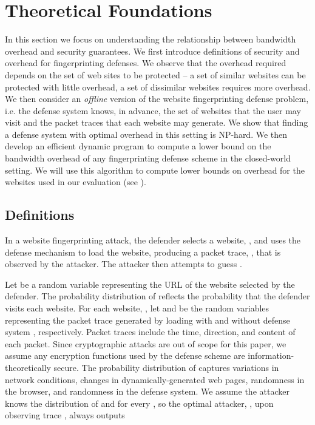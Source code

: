\documentclass[10pt,journal]{IEEEtran}
\begin{document}
\section{Theoretical Foundations}
\label{sec:theory}

In this section we focus on understanding the relationship between
bandwidth overhead and security guarantees. We first introduce
definitions of security and overhead for fingerprinting defenses.  We
observe that the overhead required depends on the set of web sites to
be protected -- a set of similar websites can be protected with little
overhead, a set of dissimilar websites requires more overhead.  We
then consider an \emph{offline} version of the website fingerprinting
defense problem, i.e. the defense system knows, in advance, the set of
websites that the user may visit and the packet traces that each
website may generate.  We show that finding a defense system with
optimal overhead in this setting is NP-hard.  We then develop an
efficient dynamic program to compute a lower bound on the bandwidth
overhead of any fingerprinting defense scheme in the closed-world
setting. We will use this algorithm to compute lower bounds on
overhead for the websites used in our evaluation (see
).


\subsection{Definitions}
\label{subsec:security_def}

In a website fingerprinting attack, the defender selects a website,
, and uses the defense mechanism to load the website, producing a
packet trace, , that is observed by the attacker.  The attacker
then attempts to guess .

Let  be a random variable representing the URL of the website
selected by the defender.  The probability distribution of 
reflects the probability that the defender visits each website.  For
each website, , let  and  be the random variables representing the
packet trace generated by loading  with and without defense system , respectively.
Packet traces include the time, direction, and content of each packet.
Since cryptographic attacks are out of scope for this paper, we assume
any encryption functions used by the defense scheme are
information-theoretically secure.  The probability distribution of
 captures variations in network conditions, changes in
dynamically-generated web pages, randomness in the browser, and
randomness in the defense system.  We assume the attacker knows the
distribution of  and  for every , so the optimal
attacker, , upon observing trace , always outputs
\end{document}
